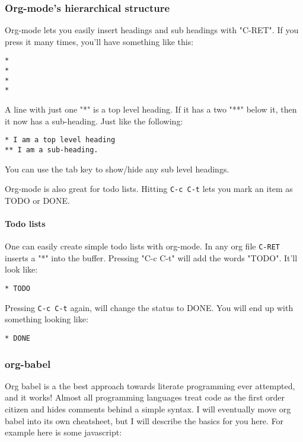\documentclass[11pt]{article}
\begin{document}
\subsubsection{Org-mode's hierarchical structure}
\label{sec:orgheadline17}
Org-mode lets you easily insert headings and sub headings with "C-RET".  If you press it many times, you'll have something like this:

\begin{verbatim}
*
*
*
*
\end{verbatim}

A line with just one "*" is a top level heading.  If it has a two "**" below it, then it now has a sub-heading.  Just like the following:
\begin{verbatim}
* I am a top level heading
** I am a sub-heading.
\end{verbatim}

You can use the tab key to show/hide any sub level headings.


Org-mode is also great for todo lists.  Hitting \texttt{C-c C-t} lets you mark an item as TODO or DONE.
\paragraph{Todo lists}
\label{sec:orgheadline16}
One can easily create simple todo lists with org-mode.  In any org file \texttt{C-RET} inserts a "*" into the buffer.  Pressing "C-c C-t" will add the words "TODO".  It'll look like:

\begin{verbatim}
* TODO
\end{verbatim}

Pressing \texttt{C-c C-t} again, will change the status to DONE.  You will end up with something looking like:

\begin{verbatim}
* DONE
\end{verbatim}

\subsubsection{org-babel}
\label{sec:orgheadline19}
Org babel is a the best approach towards literate programming ever attempted, and it works!  Almost all programming languages treat code as the first order citizen and hides comments behind a simple syntax.  I will eventually move org babel into its own cheatsheet, but I will describe the basics for you here.  For example here is some javascript:
\end{document}
